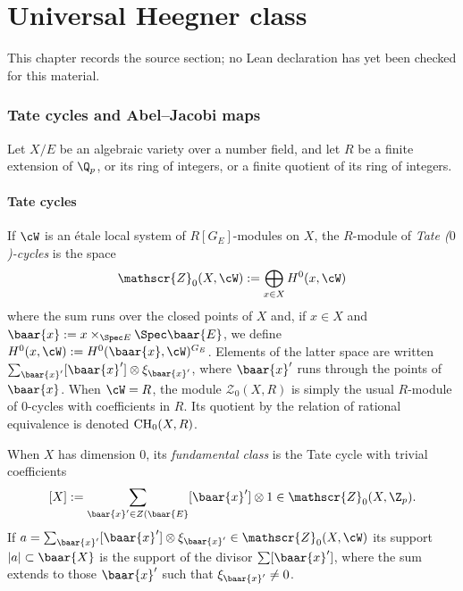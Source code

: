 \chapter{Universal Heegner class}
\label{universal-p-adic-gross-zagier-formula-chapter-06}

\begin{remark}
\label{universal-p-adic-gross-zagier-formula-chapter-06-source}
This chapter records the source section; no Lean declaration has yet been checked for this material.
\notready
\end{remark}

\subsection{Tate cycles and Abel--Jacobi maps} Let  $X/E$ be an algebraic variety over a number field, and let  $R$
be a finite extension of $\Q_{p}$, or its ring of integers, or a finite quotient of its ring of integers.
\subsubsection{Tate cycles}
If $\cW $ is an \'etale local system of  $R[G_{E}]$-modules on $X$,   the $R$-module of  \emph{Tate ($0$)-cycles} is the space
$$\mathscr{Z}_{0}(X , \cW):=\bigoplus_{x\in X} H^{0}(x, \cW)$$
where the sum runs over the closed points of $X$ and, if $x\in X$ and $\baar{x}:= x\times_{\Spec E}\Spec \baar{E}$, we define $H^{0}(x, \cW):= H^{0}(\baar{x}, \cW)^{G_{E}}$.  Elements of the latter space are written $\sum_{\baar{x}'} [\baar{x}' ]\otimes \xi_{\baar{x}'}$, where $\baar{x}'$ runs through the  points of $\baar{x}$.
When $\cW=R$, the module $\mathscr{Z}_{0}(X, R)$ is simply the usual $R$-module of $0$-cycles with coefficients in $R$. Its quotient by the relation of rational equivalence is denoted ${\rm CH}_{0}(X, R)$.


When $X$ has dimension $0$, its \emph{fundamental class} is the Tate cycle with trivial coefficients
 $$[X]:= \sum_{\baar{x}'\in Z(\baar{E}} [\baar{x}' ]  \otimes 1 \in \mathscr{Z}_{0}(X, \Z_{p}).$$
 If $a=\sum_{\baar{x}'}[\baar{x}'] \otimes \xi_{\baar{x}'}\in \mathscr{Z}_{0}(X, \cW)$ its support $|a|\subset \baar{X}$ is the support of the divisor $\sum [\baar{x}']$, where the sum extends to those $\baar{x}' $ such that $\xi_{\baar{x}'}\neq 0$.

